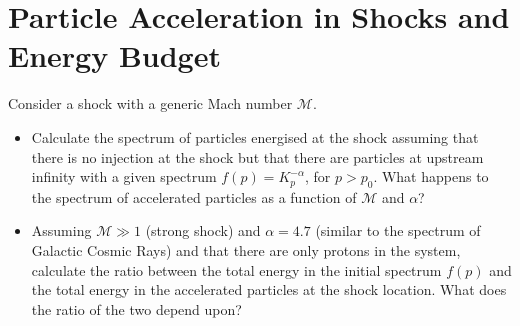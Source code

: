 \section{Particle Acceleration in Shocks and Energy Budget}

Consider a shock with a generic Mach number $\mathcal M$.

\begin{itemize}
\item Calculate the spectrum of particles energised at the shock assuming that there is no injection at the shock but that there are particles at upstream infinity with a given spectrum $f(p)=K_p^{-\alpha}$, for $p>p_0$.
What happens to the spectrum of accelerated particles as a function of $\mathcal M$ and $\alpha$?
\item Assuming $\mathcal M\gg 1$ (strong shock) and $\alpha=4.7$ (similar to the spectrum of Galactic Cosmic Rays) and that there are only protons in the system, calculate the ratio between the total energy in the initial spectrum $f(p)$ and the total energy in the accelerated particles at the shock location. What does the ratio of the two depend upon?
\end{itemize}